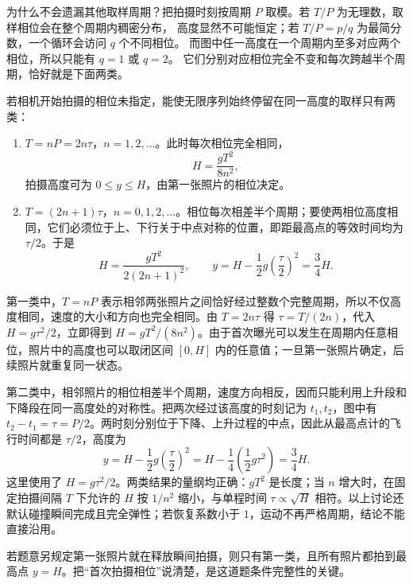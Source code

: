 {\begin{xesolution}
为什么不会遗漏其他取样周期？把拍摄时刻按周期 $P$ 取模。若 $T/P$ 为无理数，取样相位会在整个周期内稠密分布，
高度显然不可能恒定；若 $T/P=p/q$ 为最简分数，一个循环会访问 $q$ 个不同相位。
而图中任一高度在一个周期内至多对应两个相位，所以只能有 $q=1$ 或 $q=2$。
它们分别对应相位完全不变和每次跨越半个周期，恰好就是下面两类。

若相机开始拍摄的相位未指定，能使无限序列始终停留在同一高度的取样只有两类：
\begin{enumerate}
  \item $T=nP=2n\tau$，$n=1,2,\ldots$。此时每次相位完全相同，
  \[
    \boxed{H=\frac{gT^2}{8n^2}},
  \]
  拍摄高度可为 $0\le y\le H$，由第一张照片的相位决定。
  \item $T=(2n+1)\tau$，$n=0,1,2,\ldots$。相位每次相差半个周期；要使两相位高度相同，它们必须位于上、下行关于中点对称的位置，即距最高点的等效时间均为 $\tau/2$。于是
  \[
    \boxed{H=\frac{gT^2}{2(2n+1)^2}},\qquad
    \boxed{y=H-\frac12g\left(\frac{\tau}{2}\right)^2=\frac34H}.
  \]
\end{enumerate}

第一类中，$T=nP$ 表示相邻两张照片之间恰好经过整数个完整周期，所以不仅高度相同，速度的大小和方向也完全相同。由
$T=2n\tau$ 得 $\tau=T/(2n)$，代入 $H=g\tau^2/2$，立即得到
$H=gT^2/(8n^2)$。由于首次曝光可以发生在周期内任意相位，照片中的高度也可以取闭区间 $[0,H]$ 内的任意值；一旦第一张照片确定，后续照片就重复同一状态。

第二类中，相邻照片的相位相差半个周期，速度方向相反，因而只能利用上升段和下降段在同一高度处的对称性。把两次经过该高度的时刻记为 $t_1,t_2$，图中有
$t_2-t_1=\tau=P/2$。两时刻分别位于下降、上升过程的中点，因此从最高点计的飞行时间都是 $\tau/2$，高度为
\[
 y=H-\frac12g\left(\frac{\tau}{2}\right)^2
  =H-\frac14\left(\frac12g\tau^2\right)=\frac34H.
\]
这里使用了 $H=g\tau^2/2$。两类结果的量纲均正确：$gT^2$ 是长度；当 $n$ 增大时，在固定拍摄间隔 $T$ 下允许的 $H$ 按 $1/n^2$ 缩小，与单程时间 $\tau\propto\sqrt H$ 相符。以上讨论还默认碰撞瞬间完成且完全弹性；若恢复系数小于 $1$，运动不再严格周期，结论不能直接沿用。

若题意另规定第一张照片就在释放瞬间拍摄，则只有第一类，且所有照片都拍到最高点 $y=H$。把“首次拍摄相位”说清楚，是这道题条件完整性的关键。
\end{xesolution}
}

\endgroup
